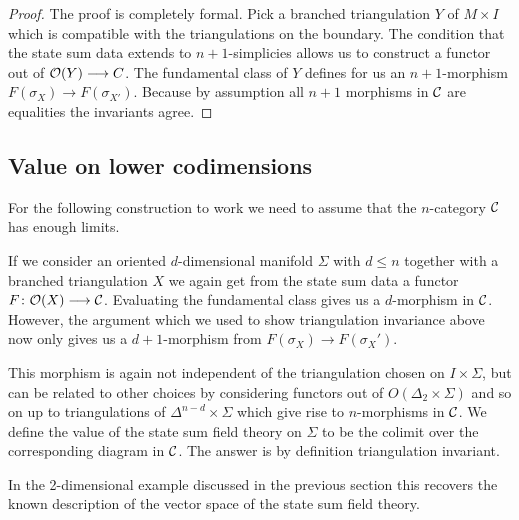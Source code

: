 \begin{proof}
	The proof is completely formal.
	Pick a branched triangulation $Y$ of $M\times I$ which is compatible with the triangulations on the boundary.
	The condition that the state sum data extends to $n+1$-simplicies allows us to construct a functor out of $\mathcal{O}(Y)\longrightarrow C $.
	The fundamental class of $Y$ defines for us an $n+1$-morphism $F(\sigma_X)\longrightarrow F(\sigma_{X'})$.
	Because by assumption all $n+1$ morphisms in $\mathcal{C}$ are equalities the invariants agree.
\end{proof}

\begin{remark}
\end{remark}

\subsection{Value on lower codimensions}

For the following construction to work we need to assume that the $n$-category $\mathcal{C}$ has enough limits.

If we consider an oriented $d$-dimensional manifold $\Sigma$ with $d\leq n$ together with a  branched triangulation $X$ we again get from the state sum data a functor $F\colon \mathcal{O}(X)\longrightarrow \mathcal{C}$.
Evaluating the fundamental class gives us a $d$-morphism in
$\mathcal{C}$.
However, the argument which we used to show triangulation invariance above now only gives us a $d+1$-morphism from $F(\sigma_X) \longrightarrow F(\sigma_X')$.

This morphism is again not independent of the triangulation chosen on $I\times \Sigma $, but can be related to other choices by considering functors out of $O(\Delta_2 \times \Sigma)$ and so on up to triangulations of $\Delta^{n-d}\times \Sigma $ which give rise to $n$-morphisms in $\mathcal{C}$.
We define the value of the state sum field theory on $\Sigma$ to be the colimit over the corresponding diagram in $\mathcal{C}$.
The answer is by definition triangulation invariant.


In the 2-dimensional example discussed in the previous section this recovers the known description of the vector space of the state sum field theory.

